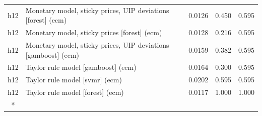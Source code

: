 \begin{ThreePartTable}
\begin{longtable}[t]{cp{5.5cm}ccc}
h12 & \raggedright Monetary model, sticky prices, UIP deviations [forest] (ecm) & 0.0126 & 0.450 & 0.595\\
h12 & \raggedright Monetary model, sticky prices [forest] (ecm) & 0.0128 & 0.216 & 0.595\\
h12 & \raggedright Monetary model, sticky prices, UIP deviations [gamboost] (ecm) & 0.0159 & 0.382 & 0.595\\
h12 & \raggedright Taylor rule model [gamboost] (ecm) & 0.0164 & 0.300 & 0.595\\
h12 & \raggedright Taylor rule model [svmr] (ecm) & 0.0202 & 0.595 & 0.595\\
h12 & \raggedright Taylor rule model [forest] (ecm) & 0.0117 & 1.000 & 1.000\\*
\end{longtable}
\end{ThreePartTable}
\endgroup{}
